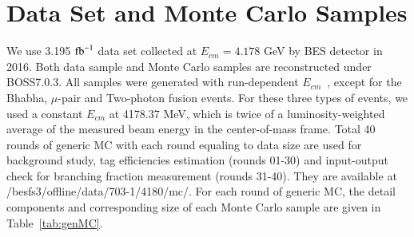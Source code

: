 \section{Data Set and Monte Carlo Samples}
We use 3.195 ${\rm fb}^{-1}$ data set collected at $E_{cm} = 4.178$ GeV by BES\uppercase\expandafter{} detector in 2016. Both data sample and Monte Carlo samples are reconstructed under BOSS7.0.3. 
All samples were generated with run-dependent $E_{cm}$~\cite{DocDB 580-v1}, except for the Bhabha, $\mu$-pair and Two-photon fusion events.
For these three types of events, we used a constant $E_{cm}$ at 4178.37 MeV, which is twice of a luminosity-weighted average of the measured beam energy in the center-of-mass frame. 
Total 40 rounds of generic MC with each round equaling to data size are used for background study, tag efficiencies estimation (rounds 01-30) and input-output check for branching fraction measurement (rounds 31-40). 
They are available at
/besfs3/offline/data/703-1/4180/mc/.
For each round of generic MC, the detail components and corresponding size of each Monte Carlo sample are given in Table~\ref{tab:genMC}.
